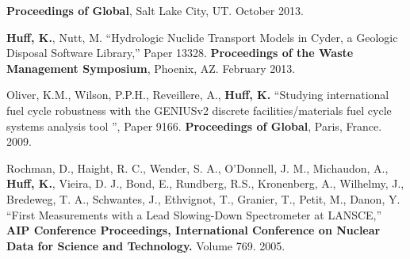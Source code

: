 \documentclass[margin,line]{resume}
\begin{document}
\begin{resume}
\begin{bibenum}
         \textbf{Proceedings of Global}, Salt Lake City, UT. October 2013.
      \item \textbf{Huff, K.}, Nutt, M. ``Hydrologic Nuclide Transport Models in Cyder, a Geologic Disposal Software Library,'' Paper 13328.
         \textbf{Proceedings of the Waste Management Symposium}, Phoenix, AZ.  February 2013.
      \item Oliver, K.M., Wilson, P.P.H., Reveillere, A., \textbf{Huff, K.} ``Studying international fuel cycle robustness with the GENIUSv2 discrete
          facilities/materials fuel cycle systems analysis tool	'', Paper 9166.
          \textbf{Proceedings of Global}, Paris, France. 2009.
      \item Rochman, D., Haight, R. C., Wender, S. A., O'Donnell, J. M.,
        Michaudon, A., \textbf{Huff, K.}, Vieira, D. J., Bond, E., Rundberg, R.S.,
        Kronenberg, A., Wilhelmy, J., Bredeweg, T. A., Schwantes, J., Ethvignot, T.,
        Granier, T., Petit, M., Danon, Y.
        ``First Measurements with a Lead Slowing-Down Spectrometer at LANSCE,''
        \textbf{AIP Conference Proceedings, International Conference on Nuclear
        Data for Science and Technology.} Volume 769. 2005.
    \end{bibenum}

\end{resume}
\end{document}
